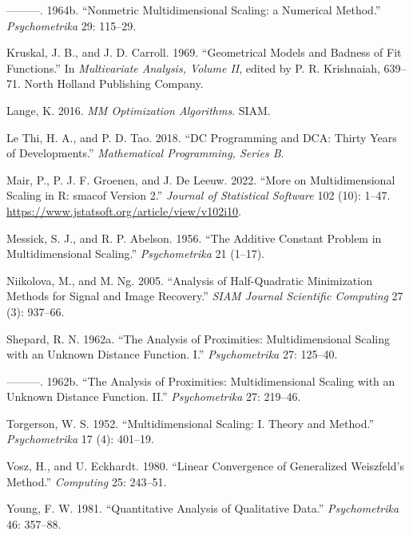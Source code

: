 \documentclass[
  12pt,
]{article}
\newlength{\cslhangindent}
\newenvironment{CSLReferences}[2] %
 {\begin{list}{}{%
  \setlength{\itemindent}{0pt}
  \setlength{\leftmargin}{0pt}
  \setlength{\parsep}{0pt}
  \ifodd #1
   \setlength{\leftmargin}{\cslhangindent}
   \setlength{\itemindent}{-1\cslhangindent}
  \fi
  \setlength{\itemsep}{#2\baselineskip}}}
 {\end{list}}
\begin{document}
\begin{CSLReferences}{1}{0}
---------. 1964b. {``{Nonmetric Multidimensional Scaling: a Numerical Method}.''} \emph{Psychometrika} 29: 115--29.

Kruskal, J. B., and J. D. Carroll. 1969. {``{Geometrical Models and Badness of Fit Functions}.''} In \emph{Multivariate Analysis, Volume II}, edited by P. R. Krishnaiah, 639--71. North Holland Publishing Company.

Lange, K. 2016. \emph{MM Optimization Algorithms}. SIAM.

Le Thi, H. A., and P. D. Tao. 2018. {``{DC Programming and DCA: Thirty Years of Developments}.''} \emph{Mathematical Programming, Series B}.

Mair, P., P. J. F. Groenen, and J. De Leeuw. 2022. {``{More on Multidimensional Scaling in R: smacof Version 2}.''} \emph{Journal of Statistical Software} 102 (10): 1--47. \url{https://www.jstatsoft.org/article/view/v102i10}.

Messick, S. J., and R. P. Abelson. 1956. {``{The Additive Constant Problem in Multidimensional Scaling}.''} \emph{Psychometrika} 21 (1--17).

Niikolova, M., and M. Ng. 2005. {``Analysis of Half-Quadratic Minimization Methods for Signal and Image Recovery.''} \emph{SIAM Journal Scientific Computing} 27 (3): 937--66.

Shepard, R. N. 1962a. {``{The Analysis of Proximities: Multidimensional Scaling with an Unknown Distance Function. I}.''} \emph{Psychometrika} 27: 125--40.

---------. 1962b. {``{The Analysis of Proximities: Multidimensional Scaling with an Unknown Distance Function. II}.''} \emph{Psychometrika} 27: 219--46.

Torgerson, W. S. 1952. {``{Multidimensional Scaling: I. Theory and Method}.''} \emph{Psychometrika} 17 (4): 401--19.

Vosz, H., and U. Eckhardt. 1980. {``{Linear Convergence of Generalized {W}eiszfeld's Method}.''} \emph{Computing} 25: 243--51.

Young, F. W. 1981. {``{Quantitative Analysis of Qualitative Data}.''} \emph{Psychometrika} 46: 357--88.


\end{CSLReferences}
\end{document}
